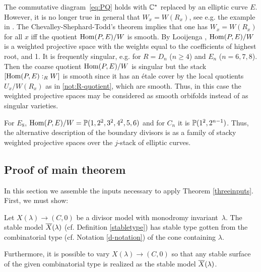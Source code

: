 \documentclass[table,x11names]{amsart}
\begin{document}
\begin{remark}
  The commutative diagram~\eqref{eq:PQ}
  holds with
  ${\mathbb C}^*$ replaced by an elliptic curve $E$. However, it is no longer
  true in general that $W_x = W(R_x)$, see e.g. the example in
  \cite[3.6]{looijenga1976root}. The Chevalley-Shephard-Todd's theorem
  implies that one has $W_x=W(R_x)$ for all $x$ iff the quotient
  $\operatorname{Hom}(P,E)/W$ is smooth.  By Looijenga
  \cite{looijenga1976root}, $\operatorname{Hom}(P,E)/W$ is a weighted projective
  space with the weights equal to the coefficients of highest root,
  and 1. It is frequently singular, e.g. for $R=D_n$ ($n\ge4$) and
  $E_n$ ($n=6,7,8$). Then the
  coarse quotient $\operatorname{Hom}(P,E)/W$ is singular but the stack
  $[\operatorname{Hom}(P,E):_R W]$ is smooth since it has an \'etale cover by the
  local quotients $U_x/W(R_x)$ as in \eqref{not:R-quotient}, which are
  smooth. Thus, in this case the weighted projective spaces may be
  considered as smooth orbifolds instead of as singular varieties.

  For $E_8$, $\operatorname{Hom}(P,E)/W = {\mathbb P}(1,2^2,3^2,4^2,5,6)$ and for $C_n$ it
  is ${\mathbb P}(1^2,2^{n-1})$.  Thus, the alternative description of the
  boundary divisors is as a family of stacky weighted projective
  spaces over the $j$-stack of elliptic curves.
 \end{remark}

\subsection{Proof of main theorem}
\label{sec:stable-models}

In this section we assemble the inputs necessary to apply Theorem \ref{threeinputs}.
First, we must show:

\begin{proposition}\label{takestable}
Let $X(\lambda)\rightarrow (C,0)$ be a divisor model with monodromy
invariant~$\lambda$. The stable model ${\overline X}(\lambda)$
(cf. Definition \ref{stabletype})
has stable type gotten from
the combinatorial type (cf. Notation \ref{d-notation}) of the cone containing $\lambda$.

Furthermore, it is possible to vary $X(\lambda)\rightarrow (C,0)$ so that
any stable surface of the given combinatorial type
is realized as the stable model ${\overline X}(\lambda)$.
  \end{proposition}
  
\end{document}
